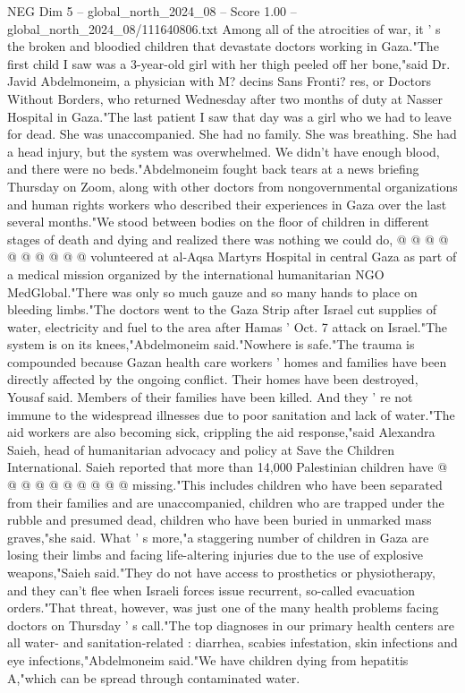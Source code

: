 \begin{textsample}{NEG Dim 5 – global\_north\_2024\_08 – Score 1.00 – global\_north\_2024\_08/111640806.txt}  \label{ex:f5_neg_076}
Among all of the atrocities of war, it ' s the broken and bloodied children that devastate doctors working in Gaza."The first child I saw was a 3-year-old girl with her thigh peeled off her bone,"said Dr.
Javid Abdelmoneim, a physician with M? decins Sans Fronti? res, or Doctors Without Borders, who returned Wednesday after two months of duty at Nasser Hospital in Gaza."The last patient I saw that day was a girl who we had to leave for dead.
She was unaccompanied.
She had no family.
She was breathing.
She had a head injury, but the system was overwhelmed.
We didn't have enough blood, and there were no beds."Abdelmoneim fought back tears at a news briefing Thursday on Zoom, along with other doctors from nongovernmental organizations and human rights workers who described their experiences in Gaza over the last several months."We stood between bodies on the floor of children in different stages of death and dying and realized there was nothing we could do, @ @ @ @ @ @ @ @ @ @ volunteered at al-Aqsa Martyrs Hospital in central Gaza as part of a medical mission organized by the international humanitarian NGO MedGlobal."There was only so much gauze and so many hands to place on bleeding limbs."The doctors went to the Gaza Strip after Israel cut supplies of water, electricity and fuel to the area after Hamas ' Oct. 7 attack on Israel."The system is on its knees,"Abdelmoneim said."Nowhere is safe."The trauma is compounded because Gazan health care workers ' homes and families have been directly affected by the ongoing conflict.
Their homes have been destroyed, Yousaf said.
Members of their families have been killed.
And they ' re not immune to the widespread illnesses due to poor sanitation and lack of water."The aid workers are also becoming sick, crippling the aid response,"said Alexandra Saieh, head of humanitarian advocacy and policy at Save the Children International.
Saieh reported that more than 14,000 Palestinian children have @ @ @ @ @ @ @ @ @ @ missing."This includes children who have been separated from their families and are unaccompanied, children who are trapped under the rubble and presumed dead, children who have been buried in unmarked mass graves,"she said.
What ' s more,"a staggering number of children in Gaza are losing their limbs and facing life-altering injuries due to the use of explosive weapons,"Saieh said."They do not have access to prosthetics or physiotherapy, and they can't flee when Israeli forces issue recurrent, so-called evacuation orders."That threat, however, was just one of the many health problems facing doctors on Thursday ' s call."The top diagnoses in our primary health centers are all water- and sanitation-related : diarrhea, scabies infestation, skin infections and eye infections,"Abdelmoneim said."We have children dying from hepatitis A,"which can be spread through contaminated water.

\end{textsample}

